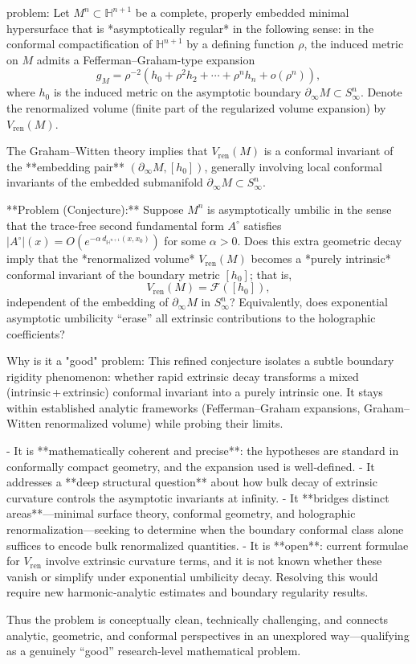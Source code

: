 problem:  
Let \( M^n \subset \mathbb{H}^{n+1} \) be a complete, properly embedded minimal hypersurface that is *asymptotically regular* in the following sense: in the conformal compactification of \(\mathbb{H}^{n+1}\) by a defining function \(\rho\), the induced metric on \(M\) admits a Fefferman–Graham-type expansion  
\[
g_M = \rho^{-2}(h_0 + \rho^2 h_2 + \cdots + \rho^n h_n + o(\rho^n)),
\]
where \(h_0\) is the induced metric on the asymptotic boundary \(\partial_\infty M\subset S^n_\infty\).  
Denote the renormalized volume (finite part of the regularized volume expansion) by \(V_{\mathrm{ren}}(M)\).

The Graham–Witten theory implies that \(V_{\mathrm{ren}}(M)\) is a conformal invariant of the **embedding pair** \((\partial_\infty M,[h_0])\), generally involving local conformal invariants of the embedded submanifold \(\partial_\infty M \subset S^n_\infty\).

**Problem (Conjecture):**  
Suppose \(M^n\) is asymptotically umbilic in the sense that the trace-free second fundamental form \(A^\circ\) satisfies \( |A^\circ|(x) = O(e^{-\alpha\, d_{\mathbb{H}^{n+1}}(x,x_0)}) \) for some \(\alpha>0\).  
Does this extra geometric decay imply that the *renormalized volume* \(V_{\mathrm{ren}}(M)\) becomes a *purely intrinsic* conformal invariant of the boundary metric \([h_0]\); that is,  
\[
V_{\mathrm{ren}}(M) = \mathcal{F}([h_0]),
\]
independent of the embedding of \(\partial_\infty M\) in \(S^n_\infty\)?  
Equivalently, does exponential asymptotic umbilicity “erase” all extrinsic contributions to the holographic coefficients?

Why is it a "good" problem:  
This refined conjecture isolates a subtle boundary rigidity phenomenon: whether rapid extrinsic decay transforms a mixed (intrinsic + extrinsic) conformal invariant into a purely intrinsic one. It stays within established analytic frameworks (Fefferman–Graham expansions, Graham–Witten renormalized volume) while probing their limits.

- It is **mathematically coherent and precise**: the hypotheses are standard in conformally compact geometry, and the expansion used is well‑defined.  
- It addresses a **deep structural question** about how bulk decay of extrinsic curvature controls the asymptotic invariants at infinity.  
- It **bridges distinct areas**—minimal surface theory, conformal geometry, and holographic renormalization—seeking to determine when the boundary conformal class alone suffices to encode bulk renormalized quantities.  
- It is **open**: current formulae for \(V_{\mathrm{ren}}\) involve extrinsic curvature terms, and it is not known whether these vanish or simplify under exponential umbilicity decay. Resolving this would require new harmonic‑analytic estimates and boundary regularity results.  

Thus the problem is conceptually clean, technically challenging, and connects analytic, geometric, and conformal perspectives in an unexplored way—qualifying as a genuinely “good” research‑level mathematical problem.